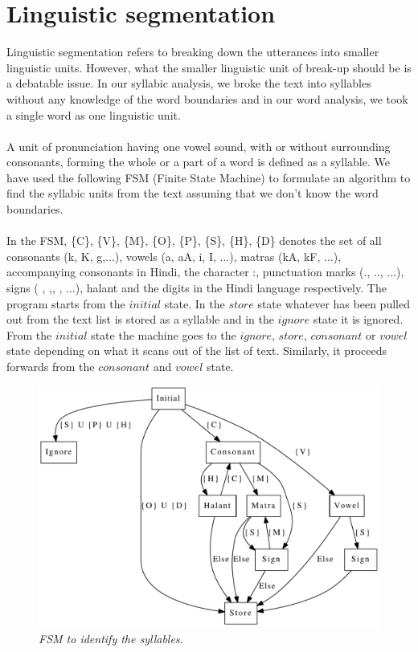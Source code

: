 \documentclass[12pt, a4paper]{report}
\begin{document}
\section{Linguistic segmentation}
Linguistic segmentation refers to breaking down the utterances into smaller linguistic units. However, what the smaller linguistic unit of break-up should be is a debatable issue. In our syllabic analysis, we broke the text into syllables without any knowledge of the word boundaries and in our word analysis, we took a single word as one linguistic unit.\\
\\
A unit of pronunciation having one vowel sound, with or without surrounding consonants, forming the whole or a part of a word is defined as a syllable. We have used the following FSM (Finite State Machine) to formulate an algorithm to find the syllabic units from the text assuming that we don’t know the word boundaries.\\
\\
In the FSM, \{C\}, \{V\}, \{M\}, \{O\}, \{P\}, \{S\}, \{H\}, \{D\} denotes the set of all consonants ({\dn k}, {\dn K}, {\dn g},...), vowels ({\dn a}, {\dn aA}, {\dn i}, {\dn I}, ...), matras ({\dn kA}, {\dn kF}, ...), accompanying consonants in Hindi, the character {\dn :}, punctuation marks ({\dn .}, {\dn ..}, ...), signs ( {\dn \2}, {\dn ,}, {\dn \1}, ...), halant and the digits in the Hindi language respectively. The program starts from the $initial$ state. In the $store$ state whatever has been pulled out from the text list is stored as a syllable and in the $ignore$ state it is ignored. From the $initial$ state the machine goes to the $ignore$, $store$, $consonant$ or $vowel$ state depending on what it scans out of the list of text. Similarly, it proceeds forwards from the $consonant$ and $vowel$ state.

\begin{figure}[!t]
\centering
\includegraphics[width=5in]{FSM.pdf}
\caption{\small \sl FSM to identify the syllables.}
\label{fig_FSM}
\end{figure}
\end{document}

